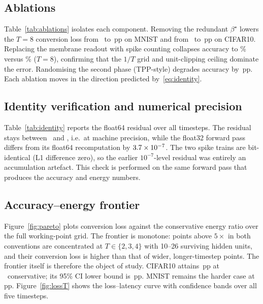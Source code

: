 \subsection{Ablations}
\label{ssec:ablations}

Table~\ref{tab:ablations} isolates each component. Removing the redundant $\beta^\star$ lowers the $T{=}8$ conversion loss from \BetaLossVoneM\ to \BetaLossVtwoM\,pp on MNIST and from \BetaLossVoneC\ to \BetaLossVtwoC\,pp on CIFAR10. Replacing the membrane readout with spike counting collapses accuracy to \CountAcc\% versus \MembraneAcc\% ($T{=}8$), confirming that the $1/T$ grid and unit-clipping ceiling dominate the error. Randomising the second phase (TPP-style) degrades accuracy by \TPPGain\,pp. Each ablation moves in the direction predicted by~\eqref{eq:identity}.

\begin{table}[t]
\centering
\caption{Component ablations at $T{=}8$ (five seeds). Values are top-1 (\%) or conversion loss (pp).}
\label{tab:ablations}

\end{table}

\subsection{Identity verification and numerical precision}
\label{ssec:verify}

Table~\ref{tab:identity} reports the float64 residual over all timesteps. The residual stays between \IdentityMin\ and \IdentityMax, i.e.\ at machine precision, while the float32 forward pass differs from its float64 recomputation by $3.7\times10^{-7}$. The two spike trains are bit-identical (L1 difference zero), so the earlier $10^{-7}$-level residual was entirely an accumulation artefact. This check is performed on the same forward pass that produces the accuracy and energy numbers.

\begin{table}[t]
\centering
\caption{Maximum $|(\Bh-B)-R A(E_1W_2)|$ in float64 across timesteps and holdout seeds.}
\label{tab:identity}

\end{table}

\subsection{Accuracy--energy frontier}
\label{ssec:frontier}

Figure~\ref{fig:pareto} plots conversion loss against the conservative energy ratio over the full working-point grid. The frontier is monotone: points above $5\times$ in both conventions are concentrated at $T\in\{2,3,4\}$ with 10--26 surviving hidden units, and their conversion loss is higher than that of wider, longer-timestep points. The frontier itself is therefore the object of study. CIFAR10 attains \CIFARLoss\,pp at \CIFAREc\texttimes\ conservative; its 95\% CI lower bound is \CIFARLower\,pp. MNIST remains the harder case at \MNISTLoss\,pp. Figure~\ref{fig:lossT} shows the loss--latency curve with confidence bands over all five timesteps.
